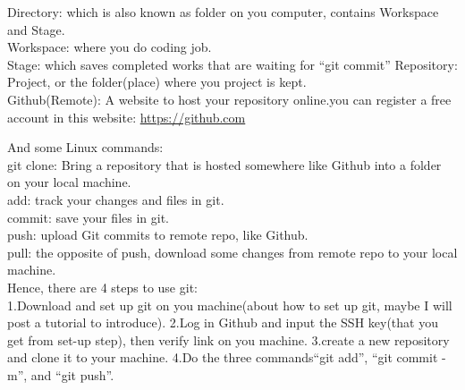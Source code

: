 \documentclass[11pt, oneside]{article}
\begin{document}
Directory: which is also known as folder on you computer, contains Workspace and Stage.\\
Workspace: where you do coding job.\\
Stage: which saves completed works that are waiting for ``git commit'' 
Repository: Project, or the folder(place) where you project is kept.\\
Github(Remote): A website to host your repository online.you can register a free account in this website:
\href{https://github.com}{https://github.com}

And some Linux commands:\\

git clone: Bring a repository that is hosted somewhere like Github into a folder on your local machine.\\
add: track your changes and files in git.\\
commit: save your files in git.\\
push: upload Git commits to  remote repo, like Github.\\
pull: the opposite of push, download some changes from remote repo to your local machine.\\ 

Hence, there are 4 steps to use git:\\

1.Download and set up git on you machine(about how to set up git, maybe I will post a tutorial to introduce).
2.Log in Github and input the SSH key(that you get from set-up step), then verify link on you machine.
3.create a new repository and clone it to your machine.
4.Do the three commands``git add'', ``git commit -m'', and ``git push''.
\end{document}

